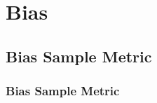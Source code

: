 \chapter{Bias}


\clearpage
\thispagestyle{clusteringstyle}
\section{Bias Sample Metric}
\subsection{Bias Sample Metric}